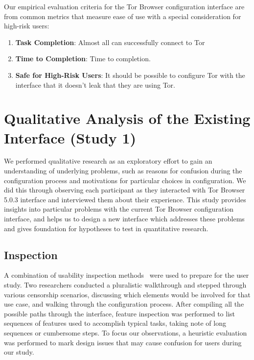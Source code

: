 \documentclass[USenglish,oneside,twocolumn]{article}
\begin{document}
Our empirical evaluation criteria for the Tor Browser configuration
interface are from common metrics that measure ease of use with a special 
consideration for high-risk users: \\

\begin{enumerate}
    \item {\bfseries Task Completion}: Almost all can successfully connect to Tor
    \item {\bfseries  Time to Completion}: Time to completion. 
    \item {\bfseries Safe for High-Risk Users}: It should be possible to configure Tor with the interface that it doesn't leak that they are using Tor. 
\end{enumerate}

\section{Qualitative Analysis of the Existing Interface (Study 1)}
\label{sec:qualitative}

We performed qualitative research as an exploratory effort to gain an 
understanding of underlying problems, such as reasons for confusion 
during the configuration process and motivations for particular choices in 
configuration. We did this through observing each participant as they 
interacted with Tor Browser 5.0.3 interface and interviewed them about
their experience. This study provides insights into particular problems with 
the current Tor Browser configuration interface, and helps us to design
a new interface which addresses these problems and gives foundation
for hypotheses to test in quantitative research. 

\subsection{Inspection}
A combination of usability inspection methods~\cite{nielsen1994usability}
were used to prepare for the user study. Two researchers conducted a pluralistic 
walkthrough and stepped through various censorship
scenarios, discussing which elements would be involved for that use case, and walking 
through the configuration process. After compiling all the possible paths through the 
interface, feature inspection was performed to list sequences
of features used to accomplish typical tasks, taking note of long sequences or cumbersome
steps. To focus our observations, a heuristic evaluation was performed to mark design issues 
that may cause confusion for users during our study. 
\end{document}
